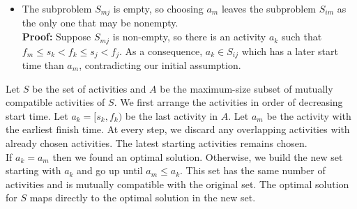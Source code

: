 \documentclass[11pt]{article}
\begin{document}
\begin{enumerate}
\begin{itemize}
        \item The subproblem $S_{mj}$ is empty, so choosing $a_m$ leaves the subproblem $S_{im}$ as the only one that may be nonempty.
        \\ \textbf{Proof: } Suppose $S_{mj}$ is non-empty, so there is an activity $a_k$ such that $f_m \leq s_k < f_k \leq s_j < f_j$. As a consequence, $a_k \in S_{ij}$ which has a later start time than $a_m$, contradicting our initial assumption.
    \end{itemize}
    Let $S$ be the set of activities and $A$ be the maximum-size subset of mutually compatible activities of $S$. We first arrange the activities in order of decreasing start time. Let $a_k = [s_k, f_k)$ be the last activity in $A$. Let $a_m$ be the activity with the earliest finish time. At every step, we discard any overlapping activities with already chosen activities. The latest starting activities remains chosen.
    \\ If $a_k = a_m$ then we found an optimal solution. Otherwise, we build the new set starting with $a_k$ and go up until $a_m \leq a_k$. This set has the same number of activities and is mutually compatible with the original set. The optimal solution for $S$ maps directly to the optimal solution in the new set.    


\end{enumerate}
\end{document}

